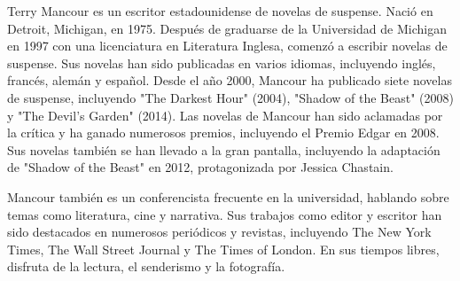 

Terry Mancour es un escritor estadounidense de novelas de suspense. Nació en Detroit, Michigan, en 1975. Después de graduarse de la Universidad de Michigan en 1997 con una licenciatura en Literatura Inglesa, comenzó a escribir novelas de suspense. Sus novelas han sido publicadas en varios idiomas, incluyendo inglés, francés, alemán y español. Desde el año 2000, Mancour ha publicado siete novelas de suspense, incluyendo "The Darkest Hour" (2004), "Shadow of the Beast" (2008) y "The Devil's Garden" (2014). Las novelas de Mancour han sido aclamadas por la crítica y ha ganado numerosos premios, incluyendo el Premio Edgar en 2008. Sus novelas también se han llevado a la gran pantalla, incluyendo la adaptación de "Shadow of the Beast" en 2012, protagonizada por Jessica Chastain.

Mancour también es un conferencista frecuente en la universidad, hablando sobre temas como literatura, cine y narrativa. Sus trabajos como editor y escritor han sido destacados en numerosos periódicos y revistas, incluyendo The New York Times, The Wall Street Journal y The Times of London. En sus tiempos libres, disfruta de la lectura, el senderismo y la fotografía.